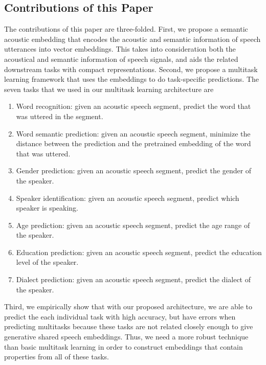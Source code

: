 \documentclass{article}
\begin{document}
\subsection{Contributions of this Paper}
The contributions of this paper are three-folded. First, we propose a semantic acoustic embedding that encodes the acoustic and semantic information of speech utterances into vector embeddings. This takes into consideration both the acoustical and semantic information of speech signals, and aids the related downstream tasks with compact representations. Second, we propose a multitask learning framework that uses the embeddings to do task-specific predictions. The seven tasks that we used in our multitask learning architecture are
\begin{enumerate}[(1)]
	\item Word recognition: given an acoustic speech segment, predict the word that was uttered in the segment.
	\item Word semantic prediction: given an acoustic speech segment, minimize the distance between the prediction and the pretrained embedding of the word that was uttered.
	\item Gender prediction: given an acoustic speech segment, predict the gender of the speaker.
	\item Speaker identification: given an acoustic speech segment, predict which speaker is speaking.
	\item Age prediction: given an acoustic speech segment, predict the age range of the speaker.
    \item Education prediction: given an acoustic speech segment, predict the education level of the speaker.
	\item Dialect prediction: given an acoustic speech segment, predict the dialect of the speaker.
\end{enumerate}
Third, we empirically show that with our proposed architecture, we are able to predict the each individual task with high accuracy, but have errors when predicting multitasks because these tasks are not related closely enough to give generative shared speech embeddings. Thus, we need a more robust technique than basic multitask learning in order to construct embeddings that contain properties from all of these tasks.
\end{document}
